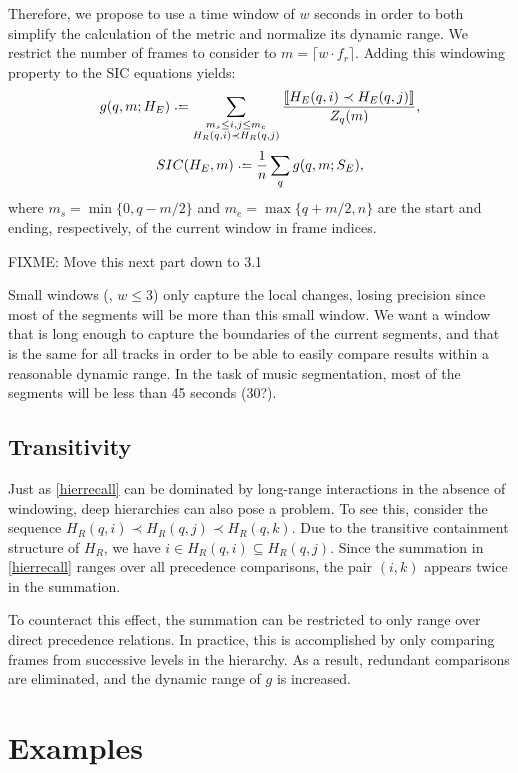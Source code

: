 \documentclass{article}
\begin{document}
Therefore, we propose to use a time window of $w$ seconds in order to both simplify the 
calculation of the metric and normalize its dynamic range.
We restrict the number of frames to consider to $m = \lceil w \cdot f_r \rceil$.
Adding this windowing property to the SIC equations yields:
\begin{equation}
  g(q, m ; H_E) \defeq \sum_{\substack{
  m_s \leq i,j \leq m_e \\ 
  H_R(q, i) \prec H_R(q, j) }} \frac{\ind{H_E(q, i) \prec H_E(q,
  j)}}{Z_q(m)},\label{windowrecall}
\end{equation}
\begin{equation}
SIC(H_E,m) \defeq \frac{1}{n} \sum_q g(q,m ; S_E),
\end{equation}
where $m_s = \min\{0,q-m/2\}$ and $m_e = \max\{q+m/2,n\}$ are the start and ending, respectively, of the current window in frame indices.

FIXME: Move this next part down to 3.1

Small windows (\eg, $w \leq 3$) only capture the local changes, 
losing precision since most of the segments will be more than this small window.
We want a window that is long enough to capture the boundaries of the current segments, and that is the same for all tracks in order to be able to easily compare results within a reasonable dynamic range.
In the task of music segmentation, most of the segments will be less than 45 seconds (30?).

\subsection{Transitivity}

Just as \cref{hierrecall} can be dominated by long-range interactions in the absence
of windowing, deep hierarchies can also pose a problem.  To see this, consider the 
sequence $H_R(q, i) \prec H_R(q, j) \prec H_R(q, k)$.  Due to the transitive
containment structure of $H_R$, we have $i \in H_R(q, i) \subseteq H_R(q, j)$.
Since the summation in \cref{hierrecall} ranges over all precedence comparisons, the
pair $(i, k)$ appears twice in the summation.  

To counteract this effect, the summation can be restricted to only range over direct
precedence relations.  In practice, this is accomplished by only comparing frames from
successive levels in the hierarchy.  As a result, redundant comparisons are
eliminated, and the dynamic range of $g$ is increased.

\section{Examples}\label{sec:using_method}
\end{document}
